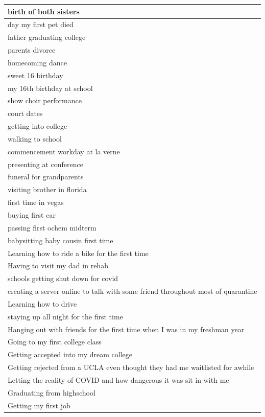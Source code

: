 \documentclass[
  .7em,
  letterpaper,
  DIV=11,
  numbers=noendperiod]{scrartcl}
\begin{document}
\begin{table}
\begin{tabular}{l}
\hline
birth of both sisters\\
\hline
day my first pet died\\
\hline
father graduating college\\
\hline
parents divorce\\
\hline
homecoming dance\\
\hline
sweet 16 birthday\\
\hline
my 16th birthday at school\\
\hline
show choir performance\\
\hline
court dates\\
\hline
getting into college\\
\hline
walking to school\\
\hline
commencement workday at la verne\\
\hline
presenting at conference\\
\hline
funeral for grandparents\\
\hline
visiting brother in florida\\
\hline
first time in vegas\\
\hline
buying first car\\
\hline
passing first ochem midterm\\
\hline
babysitting baby cousin first time\\
\hline
Learning how to ride a bike for the first time\\
\hline
Having to visit my dad in rehab\\
\hline
schools getting shut down for covid\\
\hline
creating a server online to talk with some friend throughout most of quarantine\\
\hline
Learning how to drive\\
\hline
staying up all night for the first time\\
\hline
Hanging out with friends for the first time when I was in my freshman year\\
\hline
Going to my first college class\\
\hline
Getting accepted into my dream college\\
\hline
Getting rejected from a UCLA even thought they had me waitlisted for awhile\\
\hline
Letting the reality of COVID and how dangerous it was sit in with me\\
\hline
Graduating from highschool\\
\hline
Getting my first job\\
\hline

\end{tabular}
\end{table}
\end{document}
